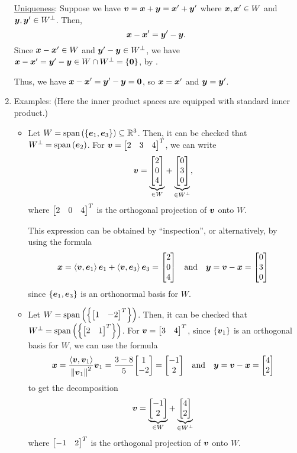 \begin{enumerate}
\underline{Uniqueness}: Suppose we have
\(\vb*{v}=\vb*{x}+\vb*{y}=\vb*{x}'+\vb*{y}'\) where
\(\vb*{x},\vb*{x}'\in W\) and \(\vb*{y},\vb*{y}'\in W^{\perp}\). Then,
\[
\vb*{x}-\vb*{x}'=\vb*{y}'-\vb*{y}.
\]
Since \(\vb*{x}-\vb*{x}'\in W\) and \(\vb*{y}'-\vb*{y}\in W^{\perp}\), we
have \(\vb*{x}-\vb*{x}'=\vb*{y}'-\vb*{y}\in W\cap W^{\perp}=\{\vb*{0}\}\),
by .

Thus, we have \(\vb*{x}-\vb*{x}'=\vb*{y}'-\vb*{y}=\vb*{0}\), so
\(\vb*{x}=\vb*{x}'\) and \(\vb*{y}=\vb*{y}'\).

\item Examples: (Here the inner product spaces are equipped with standard inner
product.)
\begin{itemize}
\item Let \(W=\operatorname{span}\qty(\{\vb*{e}_1,\vb*{e}_3\})\subseteq \mathbb{R}^3\). Then, it can be
checked that \(W^{\perp}=\operatorname{span}\qty(\vb*{e}_2)\). For \(\vect{v}=\mqty[2&3&4]^{T}\),
we can write
\[
\vect{v}=\underbrace{\mqty[2\\ 0\\ 4]}_{\in W}+\underbrace{\mqty[0\\ 3\\ 0]}_{\in W^{\perp}},
\]
where \(\mqty[2&0&4]^{T}\) is the orthogonal projection of \(\vb*{v}\) onto \(W\).

This expression can be obtained by ``inspection'', or alternatively, by using
the formula
\[
\vect{x}=\inner{\vect{v}}{\vect{e}_1}\vect{e}_1+\inner{\vect{v}}{\vect{e}_3}\vect{e}_3
=\mqty[2\\ 0\\ 4]
\qqtext{and}
\vect{y}=\vect{v}-\vect{x}=\mqty[0\\ 3\\0 ]
\]
since \(\{\vb*{e}_1,\vb*{e}_3\}\) is an orthonormal basis for \(W\).
\item Let \(W=\spn{\qty{\mqty[1&-2]^{T}}}\). Then, it can be checked that
\(W^{\perp}=\spn{\qty{\mqty[2&1]^{T}}}\). For \(\vect{v}=\mqty[3& 4]^{T}\),
since \(\{\vb*{v}_1\}\) is an orthogonal basis for \(W\), we can use the
formula
\[
\vect{x}=\frac{\inner{\vect{v}}{\vect{v}_1}}{\norm{\vect{v}_1}^{2}}\vect{v}_1
=\frac{3-8}{5}\mqty[1\\ -2]
=\mqty[-1\\ 2]
\qqtext{and}
\vect{y}=\vect{v}-\vect{x}=\mqty[4\\ 2]
\]
to get the decomposition
\[
\vect{v}=\underbrace{\mqty[-1\\ 2]}_{\in W}+\underbrace{\mqty[4\\ 2]}_{\in W^{\perp}}
\]
where \(\mqty[-1&2]^{T}\) is the orthogonal projection of \(\vb*{v}\) onto \(W\).
\begin{center}
\end{center}
\end{itemize}
\end{enumerate}
